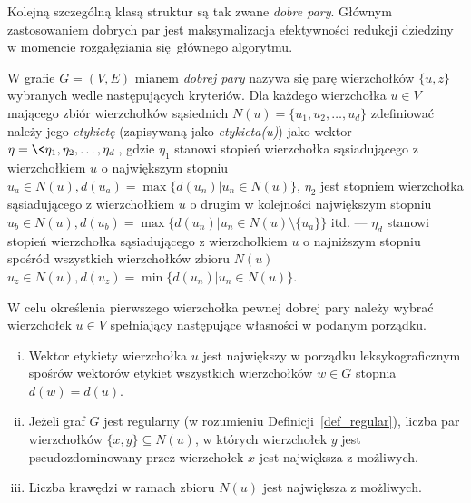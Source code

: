 \par{
  Kolejną szczególną klasą struktur są tak zwane \emph{dobre pary}.
  Głównym zastosowaniem dobrych par jest maksymalizacja efektywności redukcji dziedziny w momencie rozgałęziania się głównego algorytmu.
  \begin{definition}
    W grafie $G=(V, E)$ mianem \emph{dobrej pary} nazywa się parę wierzchołków $\{u, z\}$ wybranych wedle następujących kryteriów.
    Dla każdego wierzchołka $u \in V$ mającego zbiór wierzchołków sąsiednich $N(u)=\{u_1, u_2, \ldots, u_d\}$ zdefiniować należy jego \emph{etykietę} (zapisywaną jako \emph{etykieta(u)}) jako wektor $\eta=\<\eta_1, \eta_2, \ldots, \eta_d\>$, gdzie $\eta_1$ stanowi stopień wierzchołka sąsiadującego z wierzchołkiem $u$ o największym stopniu $u_{a} \in N(u), d(u_{a})=\max\{d(u_n) | u_n \in N(u)\}$, $\eta_2$ jest stopniem wierzchołka sąsiadującego z wierzchołkiem $u$ o drugim w kolejności największym stopniu $u_{b} \in N(u), d(u_{b})=\max\{d(u_n) | u_n \in N(u) \setminus \{u_{a}\}\}$ itd. --- $\eta_d$ stanowi stopień wierzchołka sąsiadującego z wierzchołkiem $u$ o najniższym stopniu spośród wszystkich wierzchołków zbioru $N(u)$ $u_{z} \in N(u), d(u_{z})=\min\{d(u_n) | u_n \in N(u)\}$.

    W celu określenia pierwszego wierzchołka pewnej dobrej pary należy wybrać wierzchołek $u \in V$ spełniający następujące własności w podanym porządku.
    \begin{enumerate}[(i)]
      \item Wektor etykiety wierzchołka $u$ jest największy w porządku leksykograficznym spośrów wektorów etykiet wszystkich wierzchołków $w \in G$ stopnia $d(w)=d(u)$.
      \item  Jeżeli graf $G$ jest regularny (w rozumieniu Definicji~\ref{def_regular}), liczba par wierzchołków $\{x, y\} \subseteq N(u)$, w których wierzchołek $y$ jest pseudozdominowany przez wierzchołek $x$ jest największa z możliwych.
      \item Liczba krawędzi w ramach zbioru $N(u)$ jest największa z możliwych.
    \end{enumerate}


\end{definition}}
